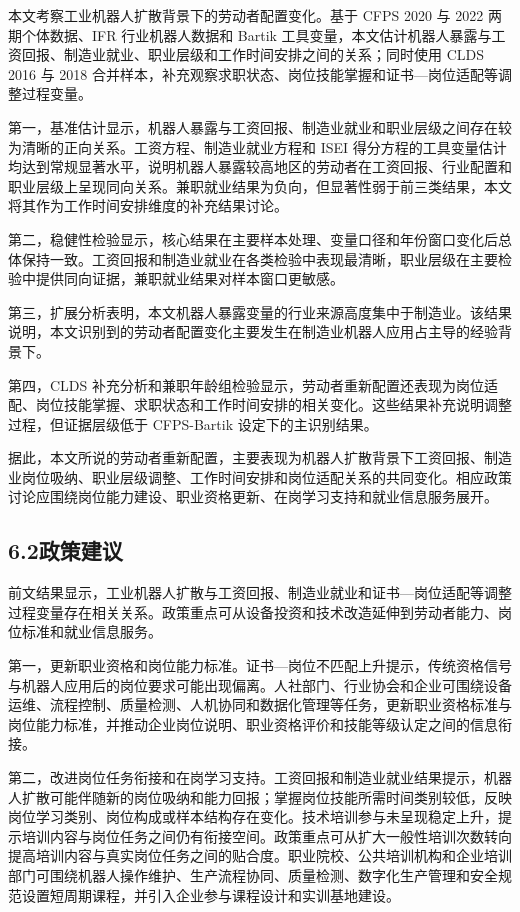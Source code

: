 本文考察工业机器人扩散背景下的劳动者配置变化。基于 CFPS 2020 与 2022 两期个体数据、IFR 行业机器人数据和 Bartik 工具变量，本文估计机器人暴露与工资回报、制造业就业、职业层级和工作时间安排之间的关系；同时使用 CLDS 2016 与 2018 合并样本，补充观察求职状态、岗位技能掌握和证书---岗位适配等调整过程变量。

第一，基准估计显示，机器人暴露与工资回报、制造业就业和职业层级之间存在较为清晰的正向关系。工资方程、制造业就业方程和 ISEI 得分方程的工具变量估计均达到常规显著水平，说明机器人暴露较高地区的劳动者在工资回报、行业配置和职业层级上呈现同向关系。兼职就业结果为负向，但显著性弱于前三类结果，本文将其作为工作时间安排维度的补充结果讨论。

第二，稳健性检验显示，核心结果在主要样本处理、变量口径和年份窗口变化后总体保持一致。工资回报和制造业就业在各类检验中表现最清晰，职业层级在主要检验中提供同向证据，兼职就业结果对样本窗口更敏感。

第三，扩展分析表明，本文机器人暴露变量的行业来源高度集中于制造业。该结果说明，本文识别到的劳动者配置变化主要发生在制造业机器人应用占主导的经验背景下。

第四，CLDS 补充分析和兼职年龄组检验显示，劳动者重新配置还表现为岗位适配、岗位技能掌握、求职状态和工作时间安排的相关变化。这些结果补充说明调整过程，但证据层级低于 CFPS-Bartik 设定下的主识别结果。

据此，本文所说的劳动者重新配置，主要表现为机器人扩散背景下工资回报、制造业岗位吸纳、职业层级调整、工作时间安排和岗位适配关系的共同变化。相应政策讨论应围绕岗位能力建设、职业资格更新、在岗学习支持和就业信息服务展开。

\subsection{6.2政策建议}\label{ux653fux7b56ux5efaux8bae}

前文结果显示，工业机器人扩散与工资回报、制造业就业和证书---岗位适配等调整过程变量存在相关关系。政策重点可从设备投资和技术改造延伸到劳动者能力、岗位标准和就业信息服务。

第一，更新职业资格和岗位能力标准。证书---岗位不匹配上升提示，传统资格信号与机器人应用后的岗位要求可能出现偏离。人社部门、行业协会和企业可围绕设备运维、流程控制、质量检测、人机协同和数据化管理等任务，更新职业资格标准与岗位能力标准，并推动企业岗位说明、职业资格评价和技能等级认定之间的信息衔接。

第二，改进岗位任务衔接和在岗学习支持。工资回报和制造业就业结果提示，机器人扩散可能伴随新的岗位吸纳和能力回报；掌握岗位技能所需时间类别较低，反映岗位学习类别、岗位构成或样本结构存在变化。技术培训参与未呈现稳定上升，提示培训内容与岗位任务之间仍有衔接空间。政策重点可从扩大一般性培训次数转向提高培训内容与真实岗位任务之间的贴合度。职业院校、公共培训机构和企业培训部门可围绕机器人操作维护、生产流程协同、质量检测、数字化生产管理和安全规范设置短周期课程，并引入企业参与课程设计和实训基地建设。

